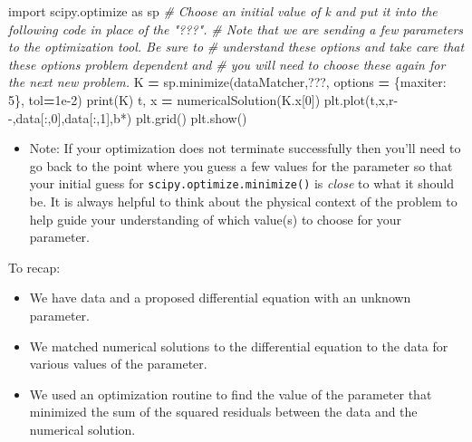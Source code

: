\documentclass[
]{book}
\newenvironment{Shaded}{\begin{snugshade}}{\end{snugshade}}
\newcommand{\BuiltInTok}[1]{#1}
\newcommand{\CommentTok}[1]{\textcolor[rgb]{0.56,0.35,0.01}{\textit{#1}}}
\newcommand{\DecValTok}[1]{\textcolor[rgb]{0.00,0.00,0.81}{#1}}
\newcommand{\FloatTok}[1]{\textcolor[rgb]{0.00,0.00,0.81}{#1}}
\newcommand{\ImportTok}[1]{#1}
\newcommand{\NormalTok}[1]{#1}
\newcommand{\OperatorTok}[1]{\textcolor[rgb]{0.81,0.36,0.00}{\textbf{#1}}}
\newcommand{\StringTok}[1]{\textcolor[rgb]{0.31,0.60,0.02}{#1}}
\providecommand{\tightlist}{%
  \setlength{\itemsep}{0pt}\setlength{\parskip}{0pt}}
\theoremstyle{definition}
\theoremstyle{definition}
\theoremstyle{definition}
\theoremstyle{remark}
\begin{document}
\begin{Shaded}
\begin{Highlighting}[]
\ImportTok{import}\NormalTok{ scipy.optimize }\ImportTok{as}\NormalTok{ sp}
\CommentTok{\# Choose an initial value of k and put it into the following code in place of the "???".}
\CommentTok{\# Note that we are sending a few parameters to the optimization tool.  Be sure to}
\CommentTok{\# understand these options and take care that these options problem dependent and }
\CommentTok{\# you will need to choose these again for the next new problem.}
\NormalTok{K }\OperatorTok{=}\NormalTok{ sp.minimize(dataMatcher,???, options }\OperatorTok{=}\NormalTok{ \{}\StringTok{\textquotesingle{}maxiter\textquotesingle{}}\NormalTok{: }\DecValTok{5}\NormalTok{\}, tol}\OperatorTok{=}\FloatTok{1e{-}2}\NormalTok{)}
\BuiltInTok{print}\NormalTok{(K)}
\NormalTok{t, x }\OperatorTok{=}\NormalTok{ numericalSolution(K.x[}\DecValTok{0}\NormalTok{])}
\NormalTok{plt.plot(t,x,}\StringTok{\textquotesingle{}r{-}{-}\textquotesingle{}}\NormalTok{,data[:,}\DecValTok{0}\NormalTok{],data[:,}\DecValTok{1}\NormalTok{],}\StringTok{\textquotesingle{}b*\textquotesingle{}}\NormalTok{)}
\NormalTok{plt.grid()}
\NormalTok{plt.show()}
\end{Highlighting}
\end{Shaded}

\begin{itemize}
\tightlist
\item
  Note: If your optimization does not terminate successfully then you'll need to go back to the point where you guess a few values for the parameter so that your initial guess for \texttt{scipy.optimize.minimize()} is \emph{close} to what it should be. It is always helpful to think about the physical context of the problem to help guide your understanding of which value(s) to choose for your parameter.
\end{itemize}

To recap:

\begin{itemize}
\tightlist
\item
  We have data and a proposed differential equation with an unknown parameter.
\item
  We matched numerical solutions to the differential equation to the data for various values of the parameter.
\item
  We used an optimization routine to find the value of the parameter that minimized the sum of the squared residuals between the data and the numerical solution.
\end{itemize}
\end{document}
